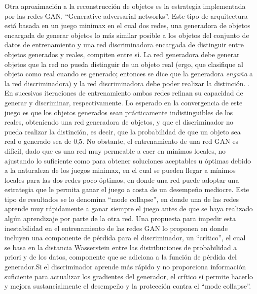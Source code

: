 \documentclass[12pt, spanish]{article}
\begin{document}
Otra aproximación a la reconstrucción de objetos es la estrategia implementada
por las redes GAN, ``Generative adversarial networks''. Este tipo de
arquitectura está basada en un juego minimax %
en el cual dos redes, una generadora de objetos encargada de generar objetos
lo más similar posible a los objetos del conjunto de datos de entrenamiento
y una red discriminadora encargada de distinguir entre objetos generados y
reales, compiten entre sí. La red generadora debe generar objetos que la red
no pueda distinguir de un objeto real (ergo, que clasifique al objeto como
real cuando es generado; entonces se dice que la generadora \textit{engaña} a
la red discriminadora) y la red discriminadora debe poder realizar la distinción.
\cite{goodfellow2016deep}. En sucesivas iteraciones de entrenamiento ambas redes 
refinan su capacidad de generar y discriminar, respectivamente. Lo esperado en
la convergencia de este juego es que los objetos generados sean prácticamente
indistinguibles de los reales, obteniendo una red generadora de objetos, y que
el discriminador no pueda realizar la distinción, es decir, que la probabilidad
de que un objeto sea real o generado sea de 0,5.
No obstante, el entrenamiento de una red GAN es difícil, dado que es una red
muy permeable a caer en mínimos locales, no ajustando lo suficiente como para
obtener soluciones aceptables u óptimas debido a la naturaleza de los juegos
minimax, en el cual se pueden llegar a mínimos locales para las dos redes poco
óptimos, en donde una red puede adoptar una estrategia que le permita ganar el
juego a costa de un desempeño mediocre. Este tipo de resultados se lo denomina
``mode collapse'', en donde una de las redes aprende muy rápidamente a ganar
siempre el juego antes de que se haya realizado algún aprendizaje por parte de
la otra red.  Una propuesta para impedir esta inestabilidad en el entrenamiento
de las redes GAN lo proponen \cite{pmlr-v70-arjovsky17a} en donde incluyen una componente
de pérdida para el discriminador, un ``crítico'', el cual se basa en la distancia
Wasserstein entre las distribuciones de probabilidad a priori y de los datos,
componente que se adiciona a la función de pérdida del generador.Si el
discriminador aprende más rápido y no proporciona información suficiente para
actualizar los gradientes del generador, el crítico sí permite hacerlo y mejora
sustancialmente el desempeño y la protección contra el ``mode collapse''.
\end{document}
